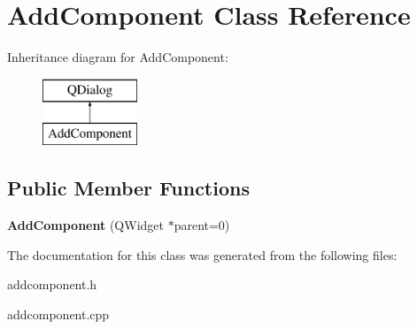 \hypertarget{classAddComponent}{\section{Add\-Component Class Reference}
\label{classAddComponent}
}
Inheritance diagram for Add\-Component\-:\begin{figure}[H]
\begin{center}
\leavevmode
\includegraphics[height=2.000000cm]{classAddComponent}
\end{center}
\end{figure}
\subsection*{Public Member Functions}
\begin{DoxyCompactItemize}
\item 
\hypertarget{classAddComponent_a09f1311751df371815dde94ca52f505e}{{\bfseries Add\-Component} (Q\-Widget $\ast$parent=0)}\label{classAddComponent_a09f1311751df371815dde94ca52f505e}

\end{DoxyCompactItemize}


The documentation for this class was generated from the following files\-:\begin{DoxyCompactItemize}
\item 
addcomponent.\-h\item 
addcomponent.\-cpp\end{DoxyCompactItemize}
